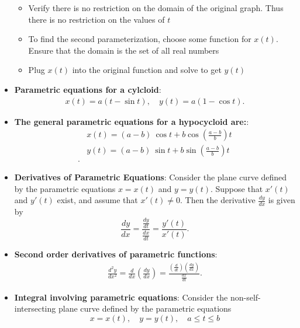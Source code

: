 \documentclass{report}
\begin{document}
\begin{itemize}
\begin{itemize}
                \item Verify there is no restriction on the domain of the original graph. Thus there is no restriction on the values of $t $
            \end{itemize}
            \begin{itemize}
                \item To find the second parameterization, choose some function for $x(t)$. Ensure that the domain is the set of all real numbers
                \item Plug $x(t)$ into the original function and solve to get $y(t)$
            \end{itemize}
        \item \textbf{Parametric equations for a cylcloid}:
            \begin{align*}
                x(t) = a(t-\sin{t}), \quad y(t) = a(1-\cos{t})
            .\end{align*}
        \item \textbf{The general parametric equations for a hypocycloid are:}:
            \begin{align*}
                &x(t) = (a-b)\ \cos{t} + b \cos{\left(\frac{a-b}{b}\right)}t \\
                &y(t) = (a-b)\ \sin{t} + b \sin{\left(\frac{a-b}{b}\right)}t \\
            .\end{align*}
        \item \textbf{Derivatives of Parametric Equations}:
            Consider the plane curve defined by the parametric equations \( x = x(t) \) and \( y = y(t) \). Suppose that \( x'(t) \) and \( y'(t) \) exist, and assume that \( x'(t) \neq 0 \). Then the derivative \( \frac{dy}{dx} \) is given by
            \[
                \frac{dy}{dx} = \frac{\frac{dy}{dt}}{\frac{dx}{dt}} = \frac{y'(t)}{x'(t)}.
            \]
        \item \textbf{Second order derivatives of parametric functions}:
            \begin{align*}
                \frac{d^{2}y}{dx^{2}} = \frac{d}{dx}\left(\frac{dy}{dx}\right) = \frac{\left(\frac{d}{dt}\right)\left(\frac{dy}{dx}\right)}{\frac{dx}{dt}}
            .\end{align*}
        \item \textbf{Integral involving parametric equations}:
            Consider the non-self-intersecting plane curve defined by the parametric equations
            \[
                x = x(t), \quad y = y(t), \quad a \leq t \leq b
\]
\end{itemize}
\end{document}
